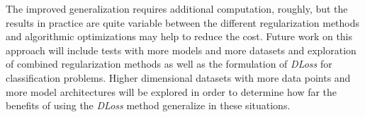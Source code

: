 \documentclass[conference]{IEEEtran}
\begin{document}
The improved generalization requires additional computation, roughly, but the results in practice are quite variable between the different regularization methods and algorithmic optimizations may help to reduce the cost. 
Future work on this approach will include tests with more models and more datasets and exploration of combined regularization methods as well as the formulation of \emph{DLoss} for classification problems. 
Higher dimensional datasets with more data points and more model architectures will be explored in order to determine how far the benefits of using the \emph{DLoss} method generalize in these situations. 



 
 

\onecolumn


\end{document}
